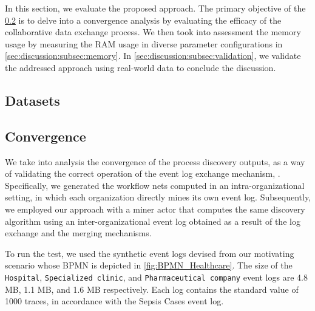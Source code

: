 In this section, we evaluate the proposed approach. The primary objective of the \cref{sec:discussion:subsec:convergence} is to delve into a convergence analysis by evaluating the efficacy of the collaborative data exchange process. We then took into assessment the memory usage by measuring the RAM usage in diverse parameter configurations in \cref{sec:discussion:subsec:memory}. In \cref{sec:discussion:subsec:validation}, we validate the addressed approach using real-world data to conclude the discussion. 

\subsection{Datasets}

\subsection{Convergence}
\label{sec:discussion:subsec:convergence}  

We take into analysis the convergence of the process discovery outputs, as a way of validating the correct operation of the event log exchange mechanism, . Specifically, we generated the workflow nets computed in an intra-organizational setting, in which each organization directly mines its own event log. Subsequently, we employed our approach with a miner actor that computes the same discovery algorithm using an inter-organizational event log obtained as a result of the log exchange and the merging mechanisms. 

To run the test, we used the synthetic event logs devised from our motivating scenario whose BPMN is depicted in \cref{fig:BPMN_Healthcare}. The size of the \texttt{Hospital}, \texttt{Specialized clinic}, and \texttt{Pharmaceutical company} event logs are 4.8 MB, 1.1 MB, and 1.6 MB respectively.  Each log contains the standard value of 1000 traces, in accordance with the Sepsis Cases \cite{sepsis} event log. %

